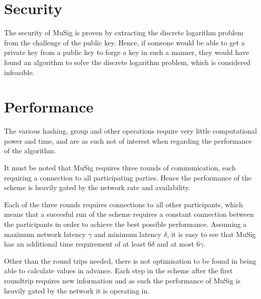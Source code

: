 \section{Security}
The security of MuSig is proven by extracting the discrete logarithm problem from the challenge of the public key. Hence, if someone would be able to get a private key from a public key to forge a key in such a manner, they would have found an algorithm to solve the discrete logarithm problem, which is considered infeasible.

\section{Performance}
The various hashing, group and other operations require very little computational power and time, and are as such not of interest when regarding the performance of the algorithm.

It must be noted that MuSig requires three rounds of communication, each requiring a connection to all participating parties. Hence the performance of the scheme is heavily gated by the network rate and availability.

Each of the three rounds requires connections to all other participants, which means that a succesful run of the scheme requires a constant connection between the participants in order to achieve the best possible performance. Assuming a maximum network latency $\gamma$ and minimum latency $\delta$, it is easy to see that MuSig has an additional time requirement of at least $6\delta$ and at most $6\gamma$.

Other than the round trips needed, there is not optimisation to be found in being able to calculate values in advance. Each step in the scheme after the first roundtrip requires new information and as such the performance of MuSig is heavily gated by the network it is operating in.